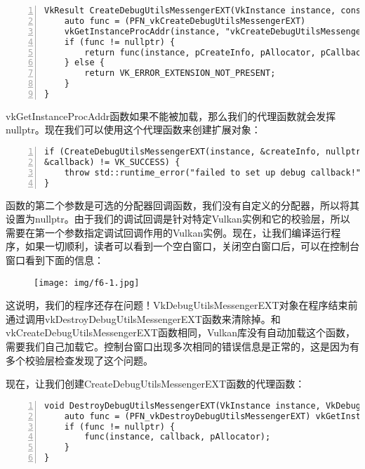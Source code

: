 \documentclass{ctexart}
\begin{document}
\begin{lstlisting}[language={[ANSI]C},keywordstyle=\color{blue!70},commentstyle=\color{red!50!green!50!blue!50},frame=shadowbox, rulesepcolor=\color{red!20!green!20!blue!20},basicstyle=\small,numbers=left, numberstyle=\tiny,breaklines=true]
VkResult CreateDebugUtilsMessengerEXT(VkInstance instance, const VkDebugUtilsMessengerCreateInfoEXT* pCreateInfo, const VkAllocationCallbacks* pAllocator, VkDebugUtilsMessengerEXT* pCallback) {
	auto func = (PFN_vkCreateDebugUtilsMessengerEXT)
	vkGetInstanceProcAddr(instance, "vkCreateDebugUtilsMessengerEXT");
	if (func != nullptr) {
		return func(instance, pCreateInfo, pAllocator, pCallback);
	} else {
		return VK_ERROR_EXTENSION_NOT_PRESENT;
	}
}
\end{lstlisting}

vkGetInstanceProcAddr函数如果不能被加载，那么我们的代理函数就会发挥nullptr。现在我们可以使用这个代理函数来创建扩展对象：

\begin{lstlisting}[language={[ANSI]C},keywordstyle=\color{blue!70},commentstyle=\color{red!50!green!50!blue!50},frame=shadowbox, rulesepcolor=\color{red!20!green!20!blue!20},basicstyle=\small,numbers=left, numberstyle=\tiny,breaklines=true]
if (CreateDebugUtilsMessengerEXT(instance, &createInfo, nullptr,
&callback) != VK_SUCCESS) {
	throw std::runtime_error("failed to set up debug callback!");
}
\end{lstlisting}

函数的第二个参数是可选的分配器回调函数，我们没有自定义的分配器，所以将其设置为nullptr。由于我们的调试回调是针对特定Vulkan实例和它的校验层，所以需要在第一个参数指定调试回调作用的Vulkan实例。现在，让我们编译运行程序，如果一切顺利，读者可以看到一个空白窗口，关闭空白窗口后，可以在控制台窗口看到下面的信息：

\begin{figure}[H]
	\centering
	\texttt{[image: img/f6-1.jpg]}
\end{figure}

这说明，我们的程序还存在问题！VkDebugUtilsMessengerEXT对象在程序结束前通过调用vkDestroyDebugUtilsMessengerEXT函数来清除掉。和vkCreateDebugUtilsMessengerEXT函数相同，Vulkan库没有自动加载这个函数，需要我们自己加载它。控制台窗口出现多次相同的错误信息是正常的，这是因为有多个校验层检查发现了这个问题。

现在，让我们创建CreateDebugUtilsMessengerEXT函数的代理函数：

\begin{lstlisting}[language={[ANSI]C},keywordstyle=\color{blue!70},commentstyle=\color{red!50!green!50!blue!50},frame=shadowbox, rulesepcolor=\color{red!20!green!20!blue!20},basicstyle=\small,numbers=left, numberstyle=\tiny,breaklines=true]
void DestroyDebugUtilsMessengerEXT(VkInstance instance, VkDebugUtilsMessengerEXT callback, const VkAllocationCallbacks* pAllocator) {
	auto func = (PFN_vkDestroyDebugUtilsMessengerEXT) vkGetInstanceProcAddr(instance, "vkDestroyDebugUtilsMessengerEXT");
	if (func != nullptr) {
		func(instance, callback, pAllocator);
	}
}
\end{lstlisting}
\end{document}
